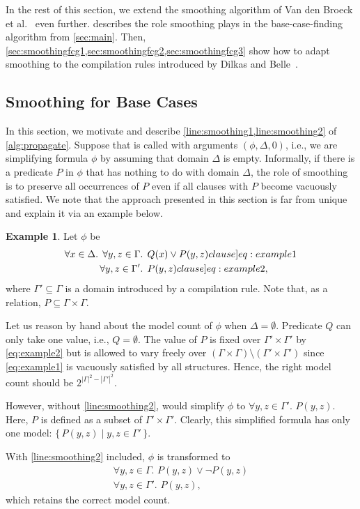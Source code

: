 \documentclass{article}
\theoremstyle{definition}
\newtheorem{example}{Example}
\begin{document}
In the rest of this section, we extend the smoothing algorithm of Van den Broeck
et al.~ even further.
 describes the role smoothing plays in the
base-case-finding algorithm from \cref{sec:main}. Then,
\cref{sec:smoothingfcg1,sec:smoothingfcg2,sec:smoothingfcg3} show how to adapt
smoothing to the compilation rules introduced by Dilkas and
Belle~.

\subsection{Smoothing for Base Cases}\label{sec:smoothingbase}

In this section, we motivate and describe \cref{line:smoothing1,line:smoothing2}
of \cref{alg:propagate}. Suppose that \Propagate is called with arguments
$(\phi, \Delta, 0)$, i.e., we are simplifying formula $\phi$ by assuming that
domain $\Delta$ is empty. Informally, if there is a predicate $P$ in $\phi$ that
has nothing to do with domain $\Delta$, the role of smoothing is to preserve all
occurrences of $P$ even if all clauses with $P$ become vacuously satisfied. We
note that the approach presented in this section is far from unique and explain
it via an example below.

\begin{example}\label{example:basecasesmoothing}
  Let $\phi$ be
  \begin{align}
    \forall x \in \Delta\text{. }\forall y, z \in \Gamma&\text{. }Q(x) \lor P(y, z)\label[clause]{eq:example1}\\
    \forall y, z \in \Gamma'&\text{. }P(y, z)\label[clause]{eq:example2},
  \end{align}
  where $\Gamma' \subseteq \Gamma$ is a domain introduced by a compilation rule.
  Note that, as a relation, $P \subseteq \Gamma \times \Gamma$.

  Let us reason by hand about the model count of $\phi$ when
  $\Delta = \emptyset$. Predicate $Q$ can only take one value, i.e.,
  $Q = \emptyset$. The value of $P$ is fixed over $\Gamma' \times \Gamma'$ by
  \cref{eq:example2} but is allowed to vary freely over
  $(\Gamma \times \Gamma) \setminus (\Gamma' \times \Gamma')$ since
  \cref{eq:example1} is vacuously satisfied by all structures. Hence, the right
  model count should be $2^{|\Gamma|^2 - |\Gamma'|^2}$.

  However, without \cref{line:smoothing2}, \Propagate would simplify $\phi$ to
  $\forall y, z \in \Gamma'\text{. }P(y, z)$. Here, $P$ is defined as a subset
  of $\Gamma' \times \Gamma'$. Clearly, this simplified formula has only one
  model: $\{\, P(y, z) \mid y, z \in \Gamma' \,\}$.

  With \cref{line:smoothing2} included, $\phi$ is transformed to
  \begin{gather*}
    \forall y, z \in \Gamma\text{. }P(y, z) \lor \neg P(y, z)\\
    \forall y, z \in \Gamma'\text{. }P(y, z),
  \end{gather*}
  which retains the correct model count.
\end{example}
\end{document}
